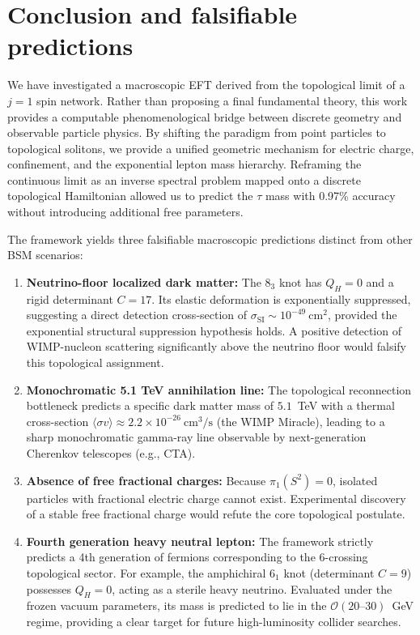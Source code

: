 \documentclass[12pt,a4paper]{article}
\begin{document}
\section{Conclusion and falsifiable predictions}
\label{sec:conclusion}

We have investigated a macroscopic EFT derived from the topological limit of a $j=1$ spin network. Rather than proposing a final fundamental theory, this work provides a computable phenomenological bridge between discrete geometry and observable particle physics. By shifting the paradigm from point particles to topological solitons, we provide a unified geometric mechanism for electric charge, confinement, and the exponential lepton mass hierarchy. Reframing the continuous limit as an inverse spectral problem mapped onto a discrete topological Hamiltonian allowed us to predict the $\tau$ mass with 0.97\% accuracy without introducing additional free parameters.

The framework yields three falsifiable macroscopic predictions distinct from other BSM scenarios:
\begin{enumerate}
\item \textbf{Neutrino-floor localized dark matter:} The $8_3$ knot has $Q_H=0$ and a rigid determinant $C=17$. Its elastic deformation is exponentially suppressed, suggesting a direct detection cross-section of $\sigma_{\text{SI}} \sim 10^{-49}\ \text{cm}^2$, provided the exponential structural suppression hypothesis holds. A positive detection of WIMP-nucleon scattering significantly above the neutrino floor would falsify this topological assignment.
\item \textbf{Monochromatic 5.1 TeV annihilation line:} The topological reconnection bottleneck predicts a specific dark matter mass of $5.1$~TeV with a thermal cross-section $\langle\sigma v\rangle \approx 2.2 \times 10^{-26}\ \text{cm}^3/\text{s}$ (the WIMP Miracle), leading to a sharp monochromatic gamma-ray line observable by next-generation Cherenkov telescopes (e.g., CTA).
\item \textbf{Absence of free fractional charges:} Because $\pi_1(S^2)=0$, isolated particles with fractional electric charge cannot exist. Experimental discovery of a stable free fractional charge would refute the core topological postulate.
\item \textbf{Fourth generation heavy neutral lepton:} The framework strictly predicts a 4th generation of fermions corresponding to the 6-crossing topological sector. For example, the amphichiral $6_1$ knot (determinant $C=9$) possesses $Q_H=0$, acting as a sterile heavy neutrino. Evaluated under the frozen vacuum parameters, its mass is predicted to lie in the $\mathcal{O}(20\text{--}30)$~GeV regime, providing a clear target for future high-luminosity collider searches.
\end{enumerate}
\end{document}

